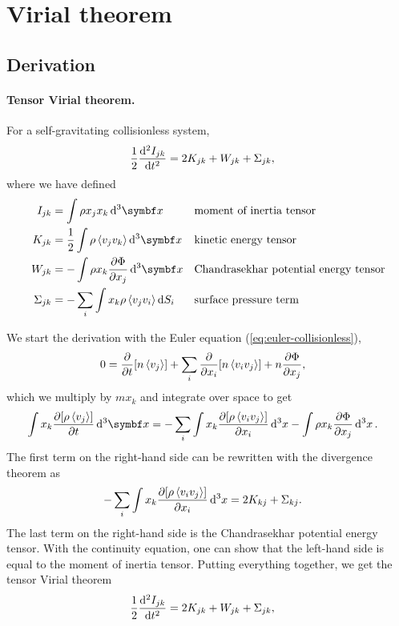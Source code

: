 \section{Virial theorem}

\subsection{Derivation}

\paragraph*{Tensor Virial theorem.}
For a self-gravitating collisionless system,
\begin{align*}
	\frac{1}{2}
	\dv[2]{I_{jk}}{t}
	&= 2 K_{jk} + W_{jk} + \Sigma_{jk},
\end{align*}
where we have defined
\begin{align*}
	I_{jk}
	&= \int \rho x_j x_k \dd{^3 \vec{x}}
	&&\text{moment of inertia tensor}\\
	K_{jk}
	&= \frac{1}{2} \int \rho \avg{v_j v_k} \dd{^3 \vec{x}}
	&&\text{kinetic energy tensor}\\
	W_{jk}
	&= - \int \rho x_k \pdv{\Phi}{x_j} \dd{^3 \vec{x}}
	&&\text{Chandrasekhar potential energy tensor}\\
	\Sigma_{jk}
	&= - \sum_i \int x_k \rho \avg{v_j v_i} \dd{S_i}
	&&\text{surface pressure term}
\end{align*}

We start the derivation with the Euler equation (\ref{eq:euler-collisionless}),
\begin{align*}
	0
	&= \pdv{}{t} [n \left\langle v_j \right\rangle]
	+ \sum_{i} \pdv{}{x_i} [n \left\langle v_i v_j \right\rangle]
	+ n \pdv{\Phi}{x_j},
\end{align*}
which we multiply by $m x_k$ and integrate over space to get
\begin{align*}
	\int x_k \pdv{[\rho\avg{v_j}]}{t} \dd{^3 \vec{x}}
	&= - \sum_i \int x_k \pdv{[\rho \avg{v_i v_j}]}{x_i} \dd{^3 x}
	- \int  \rho x_k \pdv{\Phi}{x_j} \dd{^3 x}.
\end{align*}
The first term on the right-hand side can be rewritten with the divergence theorem as
\begin{align*}
	- \sum_i \int x_k \pdv{[\rho \left\langle v_i v_j \right\rangle]}{x_i} \dd{^3 x}
	&= 2 K_{kj} + \Sigma_{kj}.
\end{align*}
The last term on the right-hand side is the Chandrasekhar potential energy tensor. With the continuity equation, one can show that the left-hand side is equal to the moment of inertia tensor. Putting everything together, we get the tensor Virial theorem
\begin{align*}
	\frac{1}{2}
	\dv[2]{I_{jk}}{t}
	&= 2 K_{jk} + W_{jk} + \Sigma_{jk},
\end{align*}


